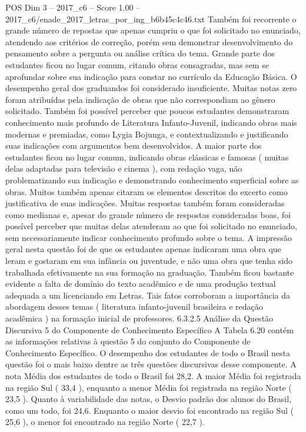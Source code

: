 \begin{textsample}{POS Dim 3 – 2017\_c6 – Score 1.00 – 2017\_c6/enade\_2017\_letras\_por\_ing\_b6b45c4c46.txt}
Também foi recorrente o grande número de repostas que apenas cumpriu o que foi solicitado no enunciado, atendendo aos critérios de correção, porém sem demonstrar desenvolvimento do pensamento sobre a pergunta ou análise crítica do tema.
Grande parte dos estudantes ficou no lugar comum, citando obras consagradas, mas sem se aprofundar sobre sua indicação para constar no currículo da Educação Básica.
O desempenho geral dos graduandos foi considerado insuficiente.
Muitas notas zero foram atribuídas pela indicação de obras que não correspondiam ao gênero solicitado.
Também foi possível perceber que poucos estudantes demonstraram conhecimento mais profundo de Literatura Infanto-Juvenil, indicando obras mais modernas e premiadas, como Lygia Bojunga, e contextualizando e justificando suas indicações com argumentos bem desenvolvidos.
A maior parte dos estudantes ficou no lugar comum, indicando obras clássicas e famosas ( muitas delas adaptadas para televisão e cinema ), com redação vaga, não problematizando sua indicação e demonstrando conhecimento superficial sobre as obras.
Muitos também apenas citaram os elementos descritos do excerto como justificativa de suas indicações.
Muitas respostas também foram consideradas como medianas e, apesar do grande número de respostas consideradas boas, foi possível perceber que muitas delas atenderam ao que foi solicitado no enunciado, sem necessariamente indicar conhecimento profundo sobre o tema.
A impressão geral nesta questão foi de que os estudantes apenas indicaram uma obra que leram e gostaram em sua infância ou juventude, e não uma obra que tenha sido trabalhada efetivamente na sua formação na graduação.
Também ficou bastante evidente a falta de domínio do texto acadêmico e de uma produção textual adequada a um licenciando em Letras.
Tais fatos corroboram a importância da abordagem desses temas ( literatura infanto-juvenil brasileira e redação acadêmica ) na formação inicial de professores. 6.3.2.5 Análise da Questão Discursiva 5 do Componente de Conhecimento Específico A Tabela 6.20 contém as informações relativas à questão 5 do conjunto do Componente de Conhecimento Específico.
O desempenho dos estudantes de todo o Brasil nesta questão foi o mais baixo dentre as três questões discursivas desse componente.
A nota Média dos estudantes de todo o Brasil foi 28,2.
A maior Média foi registrada na região Sul ( 33,4 ), enquanto a menor Média foi registrada na região Norte ( 23,5 ).
Quanto à variabilidade das notas, o Desvio padrão dos alunos do Brasil, como um todo, foi 24,6.
Enquanto o maior desvio foi encontrado na região Sul ( 25,6 ), o menor foi encontrado na região Norte ( 22,7 ).

\end{textsample}
